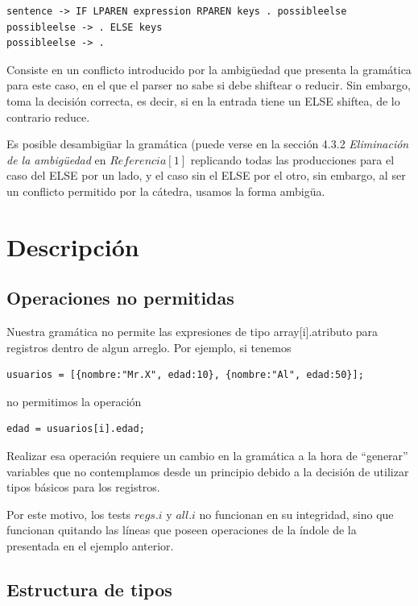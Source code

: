 \documentclass[10pt,a4paper]{article}
\begin{document}
\begin{verbatim}
sentence -> IF LPAREN expression RPAREN keys . possibleelse
possibleelse -> . ELSE keys
possibleelse -> .
\end{verbatim}

Consiste en un conflicto introducido por la ambigüedad que presenta la gramática para este caso, en el que el parser no sabe si debe shiftear o reducir. Sin embargo, toma la decisión correcta, es decir, si en la entrada tiene un ELSE shiftea, de lo contrario reduce.

Es posible desambigüar la gramática (puede verse en la sección 4.3.2 \textit{Eliminación de la ambigüedad} en $Referencia[1]$ replicando todas las producciones para el caso del ELSE por un lado, y el caso sin el ELSE por el otro, sin embargo, al ser un conflicto permitido por la cátedra, usamos la forma ambigüa.

\section{Descripción}

\subsection{Operaciones no permitidas}

Nuestra gramática no permite las expresiones de tipo array[i].atributo para registros dentro de algun arreglo.
Por ejemplo, si tenemos

\begin{verbatim}
usuarios = [{nombre:"Mr.X", edad:10}, {nombre:"Al", edad:50}];
\end{verbatim}

no permitimos la operación 
\begin{verbatim}
edad = usuarios[i].edad;
\end{verbatim}
Realizar esa operación requiere un cambio en la gramática a la hora de ``generar'' variables que no contemplamos desde un principio debido a la decisión de utilizar tipos básicos para los registros.

Por este motivo, los tests $regs.i$ y $all.i$ no funcionan en su integridad, sino que funcionan quitando las líneas que poseen operaciones de la índole de la presentada en el ejemplo anterior. 

\subsection{Estructura de tipos}
\end{document}

